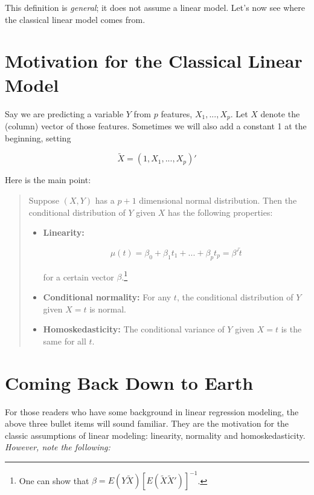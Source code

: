 This definition is \textit{general}; it does not assume a linear model.
Let's now see where the classical linear model comes from.

\section{Motivation for the Classical Linear Model}

Say we are predicting a variable $Y$ from $p$ features, $X_1,...,X_p$.
Let $X$ denote the (column) vector of those features.  Sometimes we will
also add a constant 1 at the beginning, setting

\begin{equation}
\widetilde{X} = (1,X_1,...,X_p)' 
\end{equation}

Here is the main point:

\begin{quote}
Suppose $(X,Y)$ has a $p+1$ dimensional normal distribution.  Then
the conditional distribution of $Y$ given $X$ has the following
properties:

\begin{itemize}

\item \textbf{Linearity:} 

\begin{equation}
\label{betadef}
\mu(t) = \beta_0 + \beta_1 t_1 + ... + \beta_p t_p  = \beta' \widetilde{t}
\end{equation}

for a certain vector ${\beta}$.\footnote{One can show that
$\beta = E(Y \widetilde{X}) [ E( \widetilde{X} \widetilde{X}') ]^{-1}$.}

\item \textbf{Conditional normality:}  For any $t$, the conditional
distribution of $Y$ given $X = t$ is normal.

\item \textbf{Homoskedasticity:}  The conditional
variance of $Y$ given $X = t$ is the same for all $t$.

\end{itemize} 

\end{quote}

\section{Coming Back Down to Earth}

For those readers who have some background in linear regression modeling, 
the above three bullet items will sound familiar.  They are the
motivation for the classic assumptions of linear modeling:  linearity,
normality and homoskedasticity.  \textit{However, note the following:}

